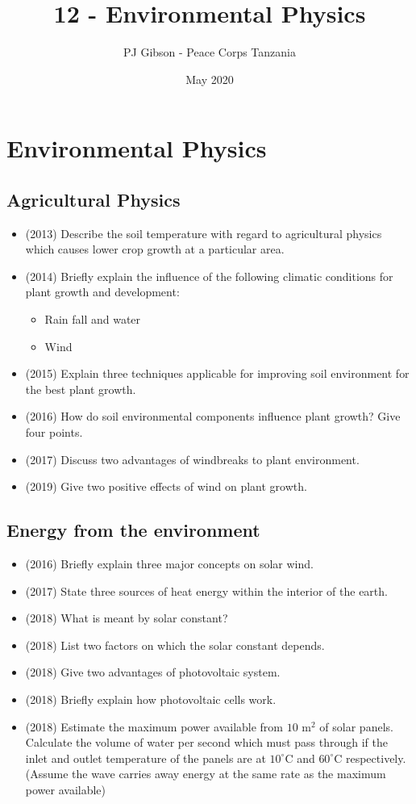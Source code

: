 \documentclass{article}
\title{\textbf{12 - Environmental Physics}}
\author{PJ Gibson - Peace Corps Tanzania}
\date{May 2020}
\newcommand{\mysection}[2]{\setcounter{section}{#1}\addtocounter{section}{-1}\section{#2}}
\begin{document}
\maketitle


\mysection{12}{Environmental Physics}

\subsection{Agricultural Physics}
\begin{itemize}
\item (2013)  Describe the soil temperature with regard to agricultural physics which causes lower crop growth at a particular area.
\item (2014)  Briefly explain the influence of the following climatic conditions for plant growth and development:
 \begin{itemize}
\item Rain fall and water
\item Wind
\end{itemize}
\item (2015)  Explain three techniques applicable for improving soil environment for the best plant growth.
\item (2016)  How do soil environmental components influence plant growth? Give four points.
\item (2017)  Discuss two advantages of windbreaks to plant environment. 
\item (2019)  Give two positive effects of wind on plant growth.
\end{itemize}

\subsection{Energy from the environment}
\begin{itemize}
\item (2016)  Briefly explain three major concepts on solar wind.
\item (2017)  State three sources of heat energy within the interior of the earth. 
\item (2018)  What is meant by solar constant? 
\item (2018)  List two factors on which the solar constant depends. 
\item (2018)  Give two advantages of photovoltaic system. 
\item (2018)  Briefly explain how photovoltaic cells work. 
\item (2018)  Estimate the maximum power available from $ 10$ m$ ^{2}$ of solar panels.  Calculate the volume of water per second which must pass through if the inlet and outlet temperature of the panels are at $ 10^{\circ}$C and $ 60^{\circ}$C respectively. (Assume the wave carries away energy at the same rate as the maximum power available)
\end{itemize}
\end{document}
